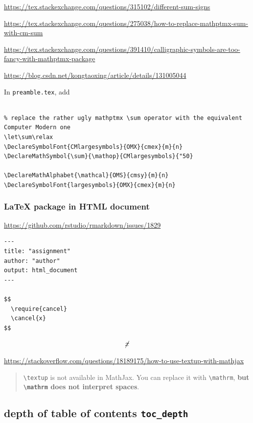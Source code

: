 \documentclass[
]{book}
\theoremstyle{definition}
\theoremstyle{definition}
\theoremstyle{definition}
\theoremstyle{definition}
\theoremstyle{remark}
\begin{document}
\url{https://tex.stackexchange.com/questions/315102/different-sum-signs}

\url{https://tex.stackexchange.com/questions/275038/how-to-replace-mathptmx-sum-with-cm-sum}

\url{https://tex.stackexchange.com/questions/391410/calligraphic-symbols-are-too-fancy-with-mathptmx-package}

\url{https://blog.csdn.net/kongtaoxing/article/details/131005044}

In \texttt{preamble.tex}, add

\begin{verbatim}

% replace the rather ugly mathptmx \sum operator with the equivalent Computer Modern one
\let\sum\relax
\DeclareSymbolFont{CMlargesymbols}{OMX}{cmex}{m}{n}
\DeclareMathSymbol{\sum}{\mathop}{CMlargesymbols}{"50}

\DeclareMathAlphabet{\mathcal}{OMS}{cmsy}{m}{n}
\DeclareSymbolFont{largesymbols}{OMX}{cmex}{m}{n}
\end{verbatim}

\subsubsection{LaTeX package in HTML document}\label{latex-package-in-html-document}

\url{https://github.com/rstudio/rmarkdown/issues/1829}

\begin{verbatim}
---
title: "assignment"
author: "author"
output: html_document
---

$$
  \require{cancel}
  \cancel{x}
$$
\end{verbatim}

\[
  \cancel{x}
\]

\url{https://stackoverflow.com/questions/18189175/how-to-use-textup-with-mathjax}

\begin{quote}
\texttt{\textbackslash{}textup} is not available in MathJax. You can replace it with \texttt{\textbackslash{}mathrm}, \textbf{but \texttt{\textbackslash{}mathrm} does not interpret spaces}.
\end{quote}

\subsection{\texorpdfstring{depth of table of contents \texttt{toc\_depth}}{depth of table of contents toc\_depth}}\label{depth-of-table-of-contents-toc_depth}
\end{document}
